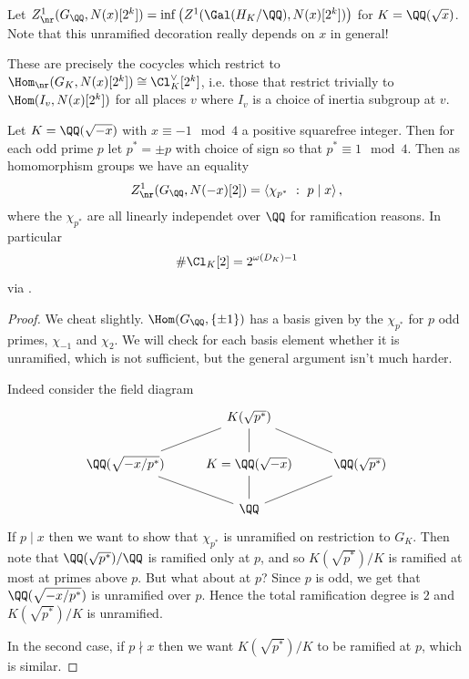 \documentclass{lecturenotes}
\numberwithin{equation}{section}
\begin{document}
\begin{definition}\label{def:Z1nr}
    Let $Z^1_\nr(G_\QQ, N(x)[2^k])=\inf\braces{Z^1(\gal(H_K/\QQ), N(x)[2^k])}$ for $K=\QQ(\sqrt{x})$.  Note that this unramified decoration really depends on $x$ in general!

    These are precisely the cocycles which restrict to $\Hom_\nr(G_K, N(x)[2^k])\cong \Cl_K^\vee[2^k]$,  i.e. those that restrict trivially to $\Hom(I_v, N(x)[2^k])$ for all places $v$ where $I_v$ is a choice of  inertia subgroup at $v$.
\end{definition}
\begin{theorem}
    Let $K=\QQ(\sqrt{-x})$ with $x\equiv -1\mod 4$ a positive squarefree integer.  Then for each odd prime $p$ let $p^*=\pm p$ with choice of sign so that $p^*\equiv 1\mod 4$.  Then as homomorphism groups we have an equality
    \[Z^1_\nr(G_\QQ, N(-x)[2])=\gp{\chi_{p^*}~:~p\mid x},\]
    where the $\chi_{p^*}$ are all linearly independet over $\QQ$ for ramification reasons.  In particular
    \[\#\Cl_K[2]=2^{\omega(D_K)-1}\]
    via .
\end{theorem}
\begin{proof}
    We cheat slightly.  $\Hom(G_\QQ, \set{\pm 1})$ has a basis given by the $\chi_{p^*}$ for $p$ odd primes, $\chi_{-1}$ and $\chi_2$.  We will check for each basis element whether it is unramified, which is not sufficient, but the general argument isn't much harder.

    Indeed consider the field diagram
    \[\begin{tikzcd}
        &K(\sqrt{p^*})\ar[d,-]\ar[dl,-]\ar[dr,-]&\\
        \QQ(\sqrt{-x/p^*})&K=\QQ(\sqrt{-x})&\QQ(\sqrt{p^*})\\
        &\QQ\ar[u,-]\ar[ur,-]\ar[ul,-]&
    \end{tikzcd}\]
    If $p\mid x$ then we want to show that $\chi_{p^*}$ is unramified on restriction to $G_K$.  Then note that $\QQ(\sqrt{p^*})/\QQ$ is ramified only at $p$, and so $K(\sqrt{p^*})/K$ is ramified at most at primes above $p$.  But what about at $p$?  Since $p$ is odd, we get that $\QQ(\sqrt{-x/p^*})$ is unramified over $p$.  Hence the total ramification degree is $2$ and $K(\sqrt{p^*})/K$ is unramified.

    In the second case, if $p\nmid x$ then we want $K(\sqrt{p^*})/K$ to be ramified at $p$, which is similar.
\end{proof}

\newpage\lecture{}{}
\end{document}
